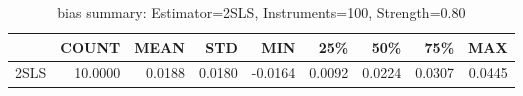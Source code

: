 \begin{table}[ht]
\centering
\caption{bias summary: Estimator=2SLS, Instruments=100, Strength=0.80}
\begin{tabular}{lrrrrrrrr}
\toprule
 & COUNT & MEAN & STD & MIN & 25\% & 50\% & 75\% & MAX \\
\midrule
2SLS & 10.0000 & 0.0188 & 0.0180 & -0.0164 & 0.0092 & 0.0224 & 0.0307 & 0.0445 \\
\bottomrule
\end{tabular}
\end{table}
